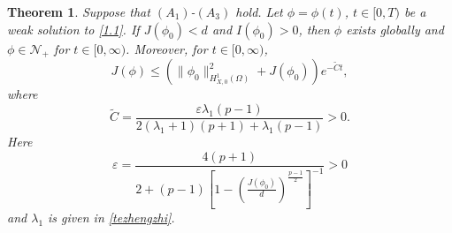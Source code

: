 \documentclass[11pt,a4paper]{article}
\numberwithin{equation}{section}
\newtheorem{thm}{Theorem}[section]
\numberwithin{remark}{section}
\begin{document}
\begin{thm}\label{decay}
Suppose that $(A_1)$-$(A_3)$ hold. Let $\phi=\phi(t)$, $t\in[0,T)$ be a weak solution to \eqref{1.1}. If $J(\phi_0)<d$ and $I(\phi_0)>0$, then $\phi$ exists globally and $\phi\in\mathcal{N}_+$ for $t\in[0,\infty)$. Moreover,  for $t\in[0,\infty)$,
\begin{equation*}
J(\phi)\leq\left(\|\phi_0\|_{H_{X,0}^1(\Omega)}^2+J(\phi_0)\right)e^{-\tilde{C}t},
\end{equation*}
where
\begin{equation*}
\tilde{C}=\frac{\varepsilon\lambda_1(p-1)}{2(\lambda_1+1)(p+1)+\lambda_1(p-1)}>0.
\end{equation*}
Here
\begin{equation}\label{vpsl}
\varepsilon=\frac{4(p+1)}{2+(p-1)\left[1-\left(\frac{J(\phi_0)}{d}\right)^{\frac{p-1}{2}}\right]^{-1}}>0
\end{equation}
and $\lambda_1$ is given in \eqref{tezhengzhi}.
\end{thm}
\end{document}

